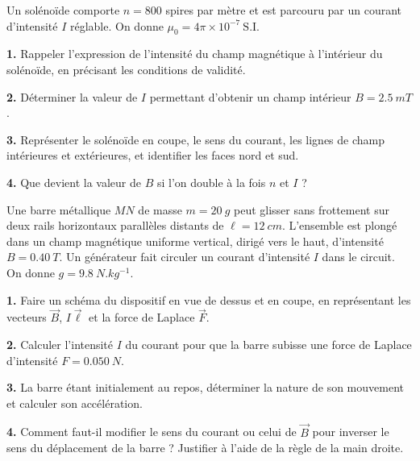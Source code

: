 \documentclass[11pt]{article}
\newcounter{popsec}
\newcounter{popsub}
\newcommand{\courssub}[1]{%
  \stepcounter{popsub}%
  \par\vspace{9pt}\noindent{\popxbold\fontsize{11.5}{13}\selectfont\color{popink}{\color{poporange}\thepopsec.\thepopsub}\hspace{6pt}#1}\par\nopagebreak\vspace{4pt}
}
\begin{document}
\courssub{Je m'entraîne}

\begin{exercice}
Un solénoïde comporte $n = 800$ spires par mètre et est parcouru par un courant d'intensité $I$ réglable. On donne $\mu_0 = 4\pi \times 10^{-7}\ \mathrm{S.I.}$

\textbf{1.} Rappeler l'expression de l'intensité du champ magnétique à l'intérieur du solénoïde, en précisant les conditions de validité.

\textbf{2.} Déterminer la valeur de $I$ permettant d'obtenir un champ intérieur $B = \SI{2,5}{mT}$.

\textbf{3.} Représenter le solénoïde en coupe, le sens du courant, les lignes de champ intérieures et extérieures, et identifier les faces nord et sud.

\textbf{4.} Que devient la valeur de $B$ si l'on double à la fois $n$ et $I$ ?
\end{exercice}

\begin{exercice}
Une barre métallique $MN$ de masse $m = \SI{20}{g}$ peut glisser sans frottement sur deux rails horizontaux parallèles distants de $\ell = \SI{12}{cm}$. L'ensemble est plongé dans un champ magnétique uniforme vertical, dirigé vers le haut, d'intensité $B = \SI{0,40}{T}$. Un générateur fait circuler un courant d'intensité $I$ dans le circuit. On donne $g = \SI{9,8}{N.kg^{-1}}$.

\textbf{1.} Faire un schéma du dispositif en vue de dessus et en coupe, en représentant les vecteurs $\vec{B}$, $I\vec{\ell}$ et la force de Laplace $\vec{F}$.

\textbf{2.} Calculer l'intensité $I$ du courant pour que la barre subisse une force de Laplace d'intensité $F = \SI{0,050}{N}$.

\textbf{3.} La barre étant initialement au repos, déterminer la nature de son mouvement et calculer son accélération.

\textbf{4.} Comment faut-il modifier le sens du courant ou celui de $\vec{B}$ pour inverser le sens du déplacement de la barre ? Justifier à l'aide de la règle de la main droite.
\end{exercice}
\end{document}
